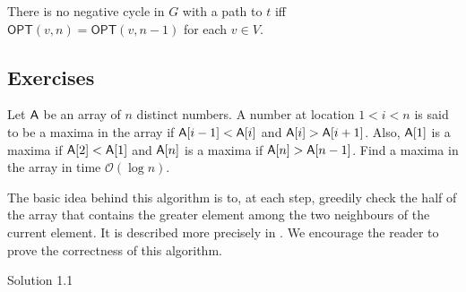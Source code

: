 \begin{lemma*}
	There is no negative cycle in $G$ with a path to $t$ iff $\mathsf{OPT}(v,n)=\mathsf{OPT}(v,n-1)$ for each $v\in V$.
\end{lemma*}

\subsection{Exercises}


\begin{exercise}
Let $\mathsf{A}$ be an array of $n$ distinct numbers. A number at location $1<i<n$ is said to be a maxima in the array if $\mathsf{A}[i-1]<\mathsf{A}[i]$ and $\mathsf{A}[i]>\mathsf{A}[i+1]$. Also, $\mathsf{A}[1]$ is a maxima if $\mathsf{A}[2]<\mathsf{A}[1]$ and $\mathsf{A}[n]$ is a maxima if $\mathsf{A}[n]>\mathsf{A}[n-1]$. Find a maxima in the array in time $\mathcal{O}(\log n)$.
\end{exercise}
\begin{solution*}
	The basic idea behind this algorithm is to, at each step, greedily check the half of the array that contains the greater element among the two neighbours of the current element. It is described more precisely in . We encourage the reader to prove the correctness of this algorithm.
\end{solution*}
\begin{algorithm}
	\DontPrintSemicolon
	\caption{Solution 1.1}\label{algo: find maxima}
\end{algorithm}

